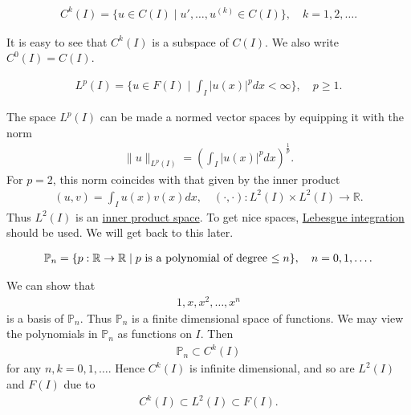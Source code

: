 \documentclass[12pt,oneside]{amsart}
\def\R{\mathbb R}
\begin{document}
\begin{definition}
    \begin{align*}
C^k(I) = \{ u \in C(I) \mid u', \dots, u^{(k)} \in C(I)\}, \quad k = 1,2,\dots.
    \end{align*}
\end{definition}

It is easy to see that $C^k(I)$ is a subspace of $C(I)$. We also write $C^0(I) = C(I)$.

\begin{definition}
    \begin{align*}
L^p(I) = \{u \in F(I) \mid \int_I |u(x)|^p dx < \infty \}, 
\quad p \ge 1.
    \end{align*}
\end{definition}

The space $L^p(I)$ can be made a normed vector spaces by equipping it with the norm 
    \begin{align*}
\|u\|_{L^p(I)} = \left( \int_I |u(x)|^p dx \right)^{\frac1p}.
    \end{align*}
For $p=2$, this norm coincides with that given by the inner product
    \begin{align*}
(u, v) = \int_I u(x) v(x) dx, \quad (\cdot, \cdot) : L^2(I) \times L^2(I) \to \mathbb R.
    \end{align*}
Thus $L^2(I)$ is an \href{https://en.wikipedia.org/wiki/Inner_product_space}{inner product space}.
To get nice spaces, \href{https://en.wikipedia.org/wiki/Lebesgue_integration}{Lebesgue integration} should be used. We will get back to this later.

\begin{definition}
    \begin{align*}
\mathbb P_n = \{p : \R \to \R \mid \textnormal{$p$ is a polynomial of degree $\le n$}\}, \quad n = 0, 1, \dots.
    \end{align*}
\end{definition}

We can show that 
    \begin{align*}
1, x, x^2, \dots, x^n
    \end{align*}
is a basis of $\mathbb P_n$. Thus $\mathbb P_n$ is a finite dimensional space of functions. 
We may view the polynomials in $\mathbb P_n$ as functions on $I$. Then
    \begin{align*}
\mathbb P_n \subset C^k(I)
    \end{align*}
for any $n,k=0,1,\dots$. Hence $C^k(I)$ is infinite dimensional,
and so are $L^2(I)$ and $F(I)$ due to 
    \begin{align*}
C^k(I) \subset L^2(I) \subset F(I).
    \end{align*}
\end{document}
